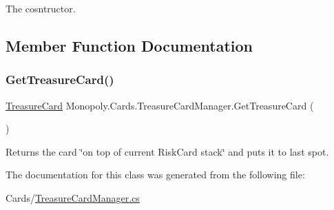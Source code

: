 The cosntructor. 

\subsection{Member Function Documentation}
\mbox{\label{class_monopoly_1_1_cards_1_1_treasure_card_manager_abe8f64e3c6dd8bfe1708de51d2e8c83e}} 
\subsubsection{\texorpdfstring{Get\+Treasure\+Card()}{GetTreasureCard()}}
{\footnotesize\ttfamily \mbox{\hyperlink{class_monopoly_1_1_main_1_1_treasure_card}{Treasure\+Card}} Monopoly.\+Cards.\+Treasure\+Card\+Manager.\+Get\+Treasure\+Card (\begin{DoxyParamCaption}{ }\end{DoxyParamCaption})\hspace{0.3cm}{\ttfamily [inline]}}

Returns the card \char`\"{}on top of current Risk\+Card stack\char`\"{} and puts it to last spot. 

The documentation for this class was generated from the following file\+:\begin{DoxyCompactItemize}
\item 
Cards/\mbox{\hyperlink{_treasure_card_manager_8cs}{Treasure\+Card\+Manager.\+cs}}\end{DoxyCompactItemize}
